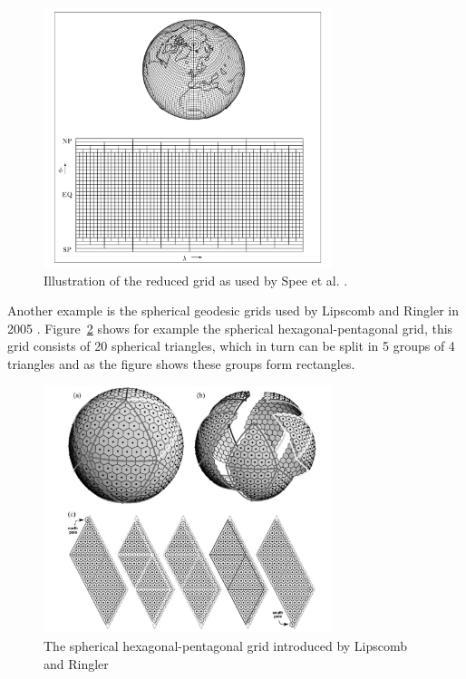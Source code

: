 \documentclass[10pt, a4paper]{article}
\newcommand{\imsize}{}
\begin{document}
\begin{figure}[htp]
\centering
\renewcommand{\imsize}{0.75\textwidth}%
\includegraphics[width=\imsize]{figures/globe}%
\caption{\label{fig:redgrid} Illustration of the reduced grid as used by Spee et al. \cite{spee}.}
\end{figure}

Another example is the spherical geodesic grids used by Lipscomb and Ringler in 2005 \cite{lipscomb}. Figure~\ref{fig:hexpent} shows for example the spherical hexagonal-pentagonal grid, this grid consists of 20 spherical triangles, which in turn can be split in 5 groups of 4 triangles and as the figure shows these groups form rectangles.

\begin{figure}[htp]
\centering
\renewcommand{\imsize}{0.75\textwidth}
\includegraphics[width=\imsize]{figures/lipcomb}%
\caption{\label{fig:hexpent} The spherical hexagonal-pentagonal grid introduced by Lipscomb and Ringler \cite{lipscomb}}
\end{figure}
\end{document}
